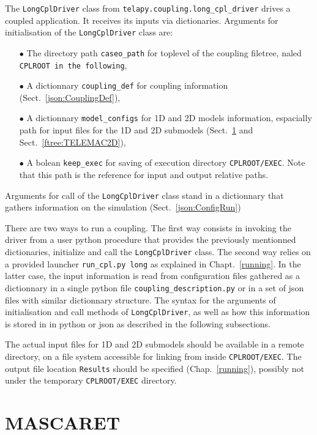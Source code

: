 The \texttt{LongCplDriver} class from \texttt{telapy.coupling.long\_cpl\_driver} drives a coupled
application. It receives its inputs via dictionaries.
Arguments for initialisation of the \texttt{LongCplDriver} class are:
\begin{itemize}
\item[$\bullet$] The directory path \texttt{caseo\_path} for toplevel of the coupling filetree, naled \texttt{CPLROOT in the following},
\item[$\bullet$] A dictionnary \texttt{coupling\_def} for coupling information (Sect.~\ref{json:CouplingDef}),
\item[$\bullet$] A dictionnary \texttt{model\_configs} for 1D and 2D models information, espacially path for input files for the 1D and 2D submodels (Sect.~\ref{ftree:MASCARET} and Sect.~\ref{ftree:TELEMAC2D}),
\item[$\bullet$] A bolean \texttt{keep\_exec} for saving of execution directory \texttt{CPLROOT/EXEC}. Note that this path is the reference for input and output relative paths.
\end{itemize}
Arguments for call of the \texttt{LongCplDriver} class stand in a dictionnary that gathers information on the simulation (Sect.~\ref{json:ConfigRun})

There are two ways to run a coupling. The first way consists in
invoking the driver from a user python procedure that provides the
previously mentionned dictionaries, initialize and call the
\texttt{LongCplDriver} class. The second way relies on a provided
launcher \texttt{run\_cpl.py long} as explained in Chapt.~\ref{running}. In the latter case, the input information is read from configuration files gathered as a dictionnary in a single python file \texttt{coupling\_description.py}
or in a set of json files with similar dictionnary structure.
The syntax for the arguments of initialisation and call methods of
\texttt{LongCplDriver}, as well as how this information is stored in
in python or json as described in the following subsections.

The actual input files for 1D and 2D submodels should be available in a remote directory, on a file system accessible for linking from inside \texttt{CPLROOT/EXEC}.
The output file location \texttt{Results} should be specified (Chap.~\ref{running}), possibly not under the temporary \texttt{CPLROOT/EXEC} directory.

\section{MASCARET}\label{ftree:MASCARET}
